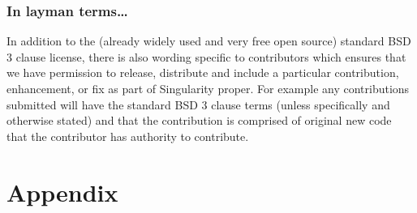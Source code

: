 \documentclass[letterpaper,10pt,english]{sphinxmanual}
\begin{document}
\begin{sphinxVerbatim}[commandchars=\\\{\}]
            
          
            
         
          
           
\end{sphinxVerbatim}


\subsection{In layman terms…}
\label{\detokenize{installation_environments:in-layman-terms}}
In addition to the (already widely used and very free open source)
standard BSD 3 clause license, there is also wording specific to
contributors which ensures that we have permission to release,
distribute and include a particular contribution, enhancement, or fix as
part of Singularity proper. For example any contributions submitted will
have the standard BSD 3 clause terms (unless specifically and otherwise
stated) and that the contribution is comprised of original new code that
the contributor has authority to contribute.


\chapter{Appendix}
\label{\detokenize{appendix:appendix}}\label{\detokenize{appendix::doc}}
\end{document}
